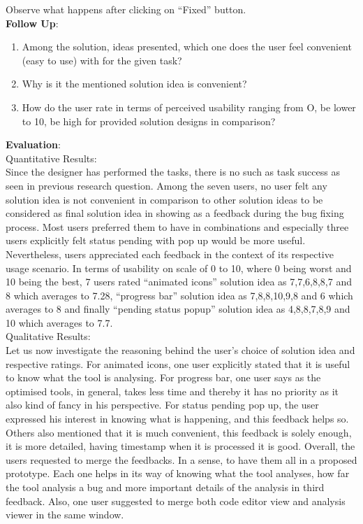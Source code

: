 Observe what happens after clicking on “Fixed” button. \\

\textbf{Follow Up}: \\

\begin{enumerate}
\item Among the solution, ideas presented, which one does the user feel convenient (easy to use) with for the given task?
\item Why is it the mentioned solution idea is convenient?
\item How do the user rate in terms of perceived usability ranging from O, be lower to 10, be high for provided solution designs in comparison?
\end{enumerate}

\textbf{Evaluation}: \\

Quantitative Results: \\

Since the designer has performed the tasks, there is no such as task success as seen in previous research question. Among the seven users, no user felt any solution idea is not convenient in comparison to other solution ideas to be considered as final solution idea in showing as a feedback during the bug fixing process.  Most users preferred them to have in combinations and especially three users explicitly felt status pending with pop up would be more useful. Nevertheless, users appreciated each feedback in the context of its respective usage scenario. In terms of usability on scale of 0 to 10, where 0 being worst and 10 being the best, 7 users rated “animated icons” solution idea as 7,7,6,8,8,7 and 8 which averages to 7.28, “progress bar” solution idea as 7,8,8,10,9,8 and 6 which averages to 8 and finally “pending status popup” solution idea as 4,8,8,7,8,9 and 10 which averages to 7.7. \\

Qualitative Results: \\

Let us now investigate the reasoning behind the user’s choice of solution idea and respective ratings. For animated icons, one user explicitly stated that it is useful to know what the tool is analysing. For progress bar, one user says as the optimised tools, in general, takes less time and thereby it has no priority as it also kind of fancy in his perspective. For status pending pop up, the user expressed his interest in knowing what is happening, and this feedback helps so. Others also mentioned that it is much convenient,  this feedback is solely enough, it is more detailed, having timestamp when it is processed it is good. Overall, the users requested to merge the feedbacks. In a sense, to have them all in a proposed prototype. Each one helps in its way of knowing what the tool analyses, how far the tool analysis a bug and more important details of the analysis in third feedback. Also, one user suggested to merge both code editor view and analysis viewer in the same window. \\

